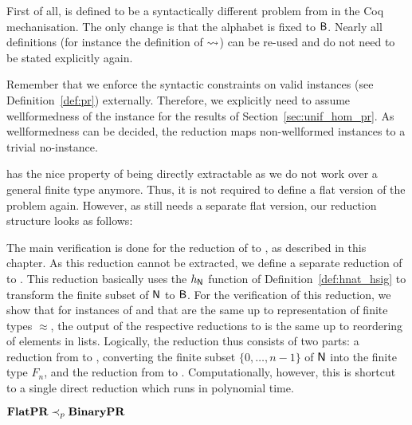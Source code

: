 First of all, \BPR{} is defined to be a syntactically different problem from \PR{} in the Coq mechanisation. The only change is that the alphabet is fixed to $\textsf{B}$. Nearly all definitions (for instance the definition of $\rightsquigarrow_{}$) can be re-used and do not need to be stated explicitly again.

Remember that we enforce the syntactic constraints on valid \PR{} instances (see Definition~\ref{def:pr}) externally. Therefore, we explicitly need to assume wellformedness of the \PR{} instance for the results of Section~\ref{sec:unif_hom_pr}. As wellformedness can be decided, the reduction maps non-wellformed instances to a trivial no-instance.

\BPR{} has the nice property of being directly extractable as we do not work over a general finite type anymore. Thus, it is not required to define a flat version of the problem again. However, as \PR{} still needs a separate flat version, our reduction structure looks as follows:
\begin{center}
\end{center}

The main verification is done for the reduction of \PR{} to \BPR{}, as described in this chapter. As this reduction cannot be extracted, we define a separate reduction of \FlatPR{} to \BPR{}. This reduction basically uses the $h_{\mathsf{N}}$ function of Definition~\ref{def:hnat_hsig} to transform the finite subset of $\mathsf{N}$ to $\textsf{B}$. 
For the verification of this reduction, we show that for instances of \FlatPR{} and \PR{} that are the same up to representation of finite types $\approx$, the output of the respective reductions to \BPR{} is the same up to reordering of elements in lists. Logically, the reduction thus consists of two parts: a reduction from \FlatPR{} to \PR{}, converting the finite subset $\{0, \ldots, n-1\}$ of $\mathsf{N}$ into the finite type $F_n$, and the reduction from \PR{} to \BPR{}. Computationally, however, this is shortcut to a single direct reduction which runs in polynomial time.
\begin{theorem}
  $\textbf{FlatPR} \prec_p{} \textbf {\textbf{BinaryPR}}{}$ 
\end{theorem}
